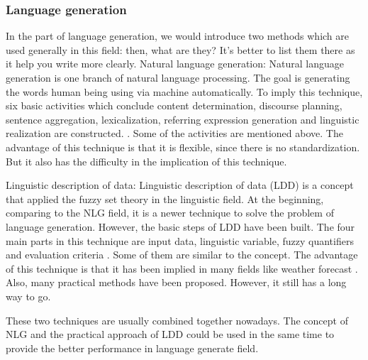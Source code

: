 \subsubsection*{Language generation}
In the part of language generation, we would introduce two methods which are used generally in this field: then, what are they? It's better to list them there as it help you write more clearly.
Natural language generation: Natural language generation is one branch of natural language processing. The goal is generating the words human being using via machine automatically. To imply this technique, six basic activities which conclude content determination, discourse planning, sentence aggregation, lexicalization, referring expression generation and linguistic realization are constructed. \cite{aramossoto2016onthe}. Some of the activities are mentioned above. The advantage of this technique is that it is flexible, since there is no standardization. But it also has the difficulty in the implication of this technique.\cite{aramossoto2016onthe}

Linguistic description of data: Linguistic description of data (LDD) is a concept that applied the fuzzy set theory in the linguistic field. At the beginning, comparing to the NLG field, it is a newer technique to solve the problem of language generation. However, the basic steps of LDD have been built. The four main parts in this technique are input data, linguistic variable, fuzzy quantifiers and evaluation criteria \cite{aramossoto2016onthe}. Some of them are similar to the concept. The advantage of this technique is that it has been implied in many fields like weather forecast \cite{Ramos-SotoBBT14}. Also, many practical methods have been proposed. However, it still has a long way to go.

These two techniques are usually combined together nowadays. The concept of NLG and the practical approach of LDD could be used in the same time to provide the better performance in language generate field.

\newpage %